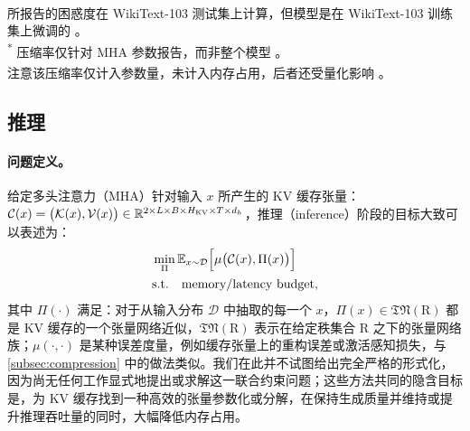 \documentclass[11pt]{article}
\newcommand{\R}{\mathbb{R}}
\newcommand{\ten}[1]{\mathcal{#1}}
\newcommand{\set}[1]{\mathrm{#1}}
\begin{document}
\begin{table}[!htbp]
\vspace{2pt}
\begin{flushleft}
\footnotesize
\textsuperscript{\textdagger} 所报告的困惑度在 WikiText-103 测试集上计算，但模型是在 WikiText-103 训练集上微调的 \cite{edalati2021kroneckergpt}。 \\
\textsuperscript{*} 压缩率仅针对 MHA 参数报告，而非整个模型 \cite{gu2025tensorllm}。 \\
\textsuperscript{\textsection} 注意该压缩率仅计入参数量，未计入内存占用，后者还受量化影响 \cite{compactifai}。
\end{flushleft}
\end{table}

\subsection{推理}
\label{subsec:inference}

\paragraph{问题定义。} 给定多头注意力（MHA）针对输入 $x$ 所产生的 KV 缓存张量：$\ten{C}(x) = \bigl(\ten{K}(x), \ten{V}(x)\bigr) \in\R^{2\times L\times B\times H_{\rm KV}\times T\times d_h}$，推理（inference）阶段的目标大致可以表述为：
\begin{equation}
  \begin{aligned}
      & \min_{\Pi} \mathbb{E}_{x \sim \mathcal{D}} \Bigl[ \mu \bigl(\ten{C}(x), \Pi(x)\bigr) \Bigr] \\
      & \rm s.t. \quad \text{memory/latency budget},
  \end{aligned}
\end{equation}
其中 $\Pi(\cdot)$ 满足：对于从输入分布 $\mathcal{D}$ 中抽取的每一个 $x$，$\Pi(x) \in \mathfrak{TN}(\set{R})$ 都是 KV 缓存的一个张量网络近似，$\mathfrak{TN}(\set{R})$ 表示在给定秩集合 $\set{R}$ 之下的张量网络族；$\mu(\cdot, \cdot)$ 是某种误差度量，例如缓存张量上的重构误差或激活感知损失，与 \cref{subsec:compression} 中的做法类似。我们在此并不试图给出完全严格的形式化，因为尚无任何工作显式地提出或求解这一联合约束问题；这些方法共同的隐含目标是，为 KV 缓存找到一种高效的张量参数化或分解，在保持生成质量并维持或提升推理吞吐量的同时，大幅降低内存占用。

\end{document}
